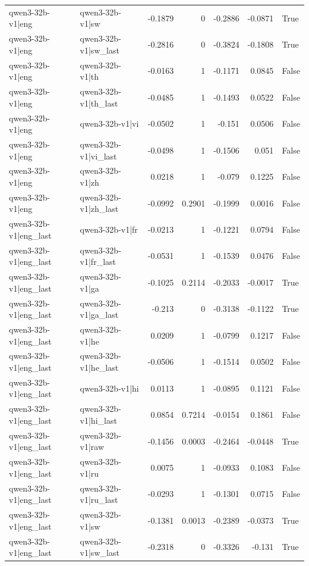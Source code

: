 \begin{table}
\begin{tabular}{l l r r r r l}
qwen3-32b-v1|eng & qwen3-32b-v1|sw & -0.1879 & 0 & -0.2886 & -0.0871 & True \\
qwen3-32b-v1|eng & qwen3-32b-v1|sw_last & -0.2816 & 0 & -0.3824 & -0.1808 & True \\
qwen3-32b-v1|eng & qwen3-32b-v1|th & -0.0163 & 1 & -0.1171 & 0.0845 & False \\
qwen3-32b-v1|eng & qwen3-32b-v1|th_last & -0.0485 & 1 & -0.1493 & 0.0522 & False \\
qwen3-32b-v1|eng & qwen3-32b-v1|vi & -0.0502 & 1 & -0.151 & 0.0506 & False \\
qwen3-32b-v1|eng & qwen3-32b-v1|vi_last & -0.0498 & 1 & -0.1506 & 0.051 & False \\
qwen3-32b-v1|eng & qwen3-32b-v1|zh & 0.0218 & 1 & -0.079 & 0.1225 & False \\
qwen3-32b-v1|eng & qwen3-32b-v1|zh_last & -0.0992 & 0.2901 & -0.1999 & 0.0016 & False \\
qwen3-32b-v1|eng_last & qwen3-32b-v1|fr & -0.0213 & 1 & -0.1221 & 0.0794 & False \\
qwen3-32b-v1|eng_last & qwen3-32b-v1|fr_last & -0.0531 & 1 & -0.1539 & 0.0476 & False \\
qwen3-32b-v1|eng_last & qwen3-32b-v1|ga & -0.1025 & 0.2114 & -0.2033 & -0.0017 & True \\
qwen3-32b-v1|eng_last & qwen3-32b-v1|ga_last & -0.213 & 0 & -0.3138 & -0.1122 & True \\
qwen3-32b-v1|eng_last & qwen3-32b-v1|he & 0.0209 & 1 & -0.0799 & 0.1217 & False \\
qwen3-32b-v1|eng_last & qwen3-32b-v1|he_last & -0.0506 & 1 & -0.1514 & 0.0502 & False \\
qwen3-32b-v1|eng_last & qwen3-32b-v1|hi & 0.0113 & 1 & -0.0895 & 0.1121 & False \\
qwen3-32b-v1|eng_last & qwen3-32b-v1|hi_last & 0.0854 & 0.7214 & -0.0154 & 0.1861 & False \\
qwen3-32b-v1|eng_last & qwen3-32b-v1|raw & -0.1456 & 0.0003 & -0.2464 & -0.0448 & True \\
qwen3-32b-v1|eng_last & qwen3-32b-v1|ru & 0.0075 & 1 & -0.0933 & 0.1083 & False \\
qwen3-32b-v1|eng_last & qwen3-32b-v1|ru_last & -0.0293 & 1 & -0.1301 & 0.0715 & False \\
qwen3-32b-v1|eng_last & qwen3-32b-v1|sw & -0.1381 & 0.0013 & -0.2389 & -0.0373 & True \\
qwen3-32b-v1|eng_last & qwen3-32b-v1|sw_last & -0.2318 & 0 & -0.3326 & -0.131 & True \\

\end{tabular}
\end{table}
